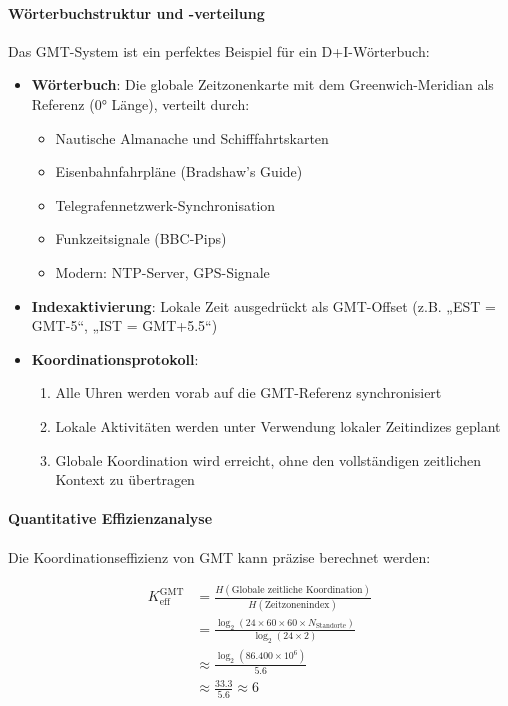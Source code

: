 \documentclass[11pt,a4paper]{article}
\begin{document}
	\paragraph{Wörterbuchstruktur und -verteilung}
	Das GMT-System ist ein perfektes Beispiel für ein D+I-Wörterbuch:
	
	\begin{itemize}
		\item \textbf{Wörterbuch}: Die globale Zeitzonenkarte mit dem Greenwich-Meridian als Referenz (0° Länge), verteilt durch:
		\begin{itemize}
			\item Nautische Almanache und Schifffahrtskarten
			\item Eisenbahnfahrpläne (Bradshaw's Guide)
			\item Telegrafennetzwerk-Synchronisation
			\item Funkzeitsignale (BBC-Pips)
			\item Modern: NTP-Server, GPS-Signale
		\end{itemize}
		
		\item \textbf{Indexaktivierung}: Lokale Zeit ausgedrückt als GMT-Offset (z.B. „EST = GMT-5“, „IST = GMT+5.5“)
		
		\item \textbf{Koordinationsprotokoll}: 
		\begin{enumerate}
			\item Alle Uhren werden vorab auf die GMT-Referenz synchronisiert
			\item Lokale Aktivitäten werden unter Verwendung lokaler Zeitindizes geplant
			\item Globale Koordination wird erreicht, ohne den vollständigen zeitlichen Kontext zu übertragen
		\end{enumerate}
	\end{itemize}
	
	\paragraph{Quantitative Effizienzanalyse}
	Die Koordinationseffizienz von GMT kann präzise berechnet werden:
	
	\begin{align}
		K_{\mathrm{eff}}^{\mathrm{GMT}} &= \frac{H(\text{Globale zeitliche Koordination})}{H(\text{Zeitzonenindex})} \\
		&= \frac{\log_2\left(24 \times 60 \times 60 \times N_{\text{Standorte}}\right)}{\log_2(24 \times 2)} \\
		&\approx \frac{\log_2(86.400 \times 10^6)}{5.6} \\
		&\approx \frac{33.3}{5.6} \approx 6
	\end{align}
	
\end{document}
